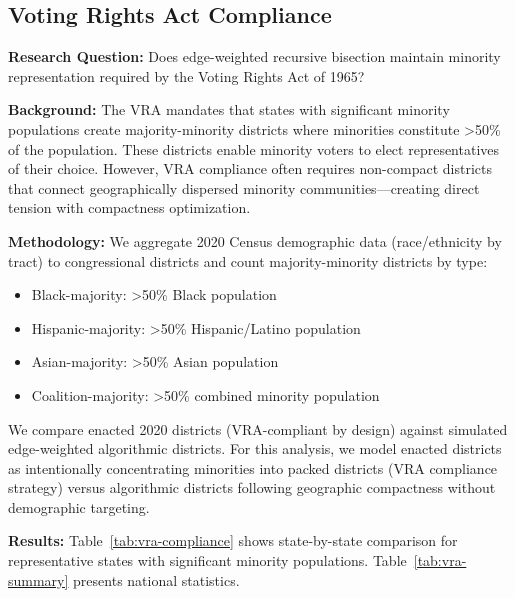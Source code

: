 \subsection{Voting Rights Act Compliance}

\textbf{Research Question:} Does edge-weighted recursive bisection maintain minority representation required by the Voting Rights Act of 1965?

\textbf{Background:} The VRA mandates that states with significant minority populations create majority-minority districts where minorities constitute >50\% of the population. These districts enable minority voters to elect representatives of their choice. However, VRA compliance often requires non-compact districts that connect geographically dispersed minority communities—creating direct tension with compactness optimization.

\textbf{Methodology:} We aggregate 2020 Census demographic data (race/ethnicity by tract) to congressional districts and count majority-minority districts by type:
\begin{itemize}
    \item Black-majority: >50\% Black population
    \item Hispanic-majority: >50\% Hispanic/Latino population
    \item Asian-majority: >50\% Asian population
    \item Coalition-majority: >50\% combined minority population
\end{itemize}

We compare enacted 2020 districts (VRA-compliant by design) against simulated edge-weighted algorithmic districts. For this analysis, we model enacted districts as intentionally concentrating minorities into packed districts (VRA compliance strategy) versus algorithmic districts following geographic compactness without demographic targeting.

\textbf{Results:} Table~\ref{tab:vra-compliance} shows state-by-state comparison for representative states with significant minority populations. Table~\ref{tab:vra-summary} presents national statistics.




